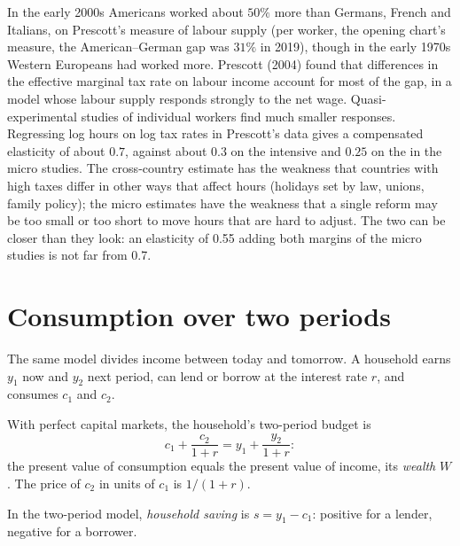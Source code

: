 \begin{debate}
In the early 2000s Americans worked about $50\%$ more than Germans, French
and Italians, on Prescott's measure of labour supply (per worker, the
opening chart's measure, the American--German gap was $31\%$ in
2019), %
though in the early 1970s Western Europeans had worked
more. Prescott (2004) found that differences in the
effective marginal tax rate on labour income account for most of the gap,
in a model whose labour supply responds strongly to the net
wage. %
Quasi-experimental studies of individual workers find much smaller
responses. Regressing log hours on log tax rates in Prescott's data gives a
compensated elasticity of about $0.7$, against about $0.3$ on the intensive
and $0.25$ on the  in the micro
studies. %
The cross-country estimate has the weakness that countries with high taxes
differ in other ways that affect hours (holidays set by law, unions,
family policy); the micro estimates have the weakness that a single
reform may be too small or too short to move hours that are hard to adjust.
The two can be closer than they look: an elasticity of 0.55 adding both
margins of the micro studies is not far from 0.7.
\end{debate}

\section{Consumption over two periods}\label{sec:b1:labour-supply-and-saving:two-periods}

The same model divides income between today and tomorrow. A household
earns $y_1$ now and $y_2$ next period, can lend or borrow at the interest rate
$r$, and consumes $c_1$ and $c_2$.

\begin{definition}\label{def:b1:labour-supply-and-saving:intertemporal-budget}
With perfect capital markets, the household's two-period budget is
\[
c_1 + \frac{c_2}{1 + r} = y_1 + \frac{y_2}{1 + r}:
\]
the present value of consumption equals the present value of income, its
\emph{wealth} $W$. The price of $c_2$ in units of $c_1$ is $1/(1 + r)$.
\end{definition}

\begin{definition}\label{def:b1:labour-supply-and-saving:household-saving}
In the two-period model, \emph{household saving} is $s = y_1 - c_1$: positive
for a lender, negative for a borrower.
\end{definition}

